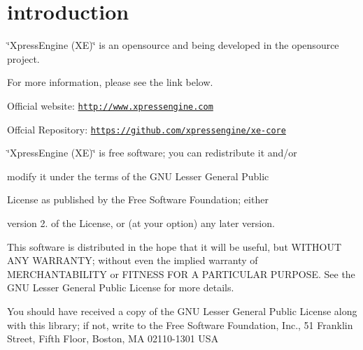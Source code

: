 \hypertarget{index_intro}{}\section{introduction}\label{index_intro}
\char`\"{}\-Xpress\-Engine (\-X\-E)\char`\"{} is an opensource and being developed in the opensource project.\par
For more information, please see the link below.
\begin{DoxyItemize}
\item Official website\-: \href{http://www.xpressengine.com}{\tt http\-://www.\-xpressengine.\-com}
\item Offcial Repository\-: \href{https://github.com/xpressengine/xe-core}{\tt https\-://github.\-com/xpressengine/xe-\/core} \par
\char`\"{}\-Xpress\-Engine (\-X\-E)\char`\"{} is free software; you can redistribute it and/or \par
modify it under the terms of the G\-N\-U Lesser General Public \par
License as published by the Free Software Foundation; either \par
version 2. of the License, or (at your option) any later version. \par
\par
This software is distributed in the hope that it will be useful, but W\-I\-T\-H\-O\-U\-T A\-N\-Y W\-A\-R\-R\-A\-N\-T\-Y; without even the implied warranty of M\-E\-R\-C\-H\-A\-N\-T\-A\-B\-I\-L\-I\-T\-Y or F\-I\-T\-N\-E\-S\-S F\-O\-R A P\-A\-R\-T\-I\-C\-U\-L\-A\-R P\-U\-R\-P\-O\-S\-E. See the G\-N\-U Lesser General Public License for more details. \par
You should have received a copy of the G\-N\-U Lesser General Public License along with this library; if not, write to the Free Software Foundation, Inc., 51 Franklin Street, Fifth Floor, Boston, M\-A 02110-\/1301 U\-S\-A 
\end{DoxyItemize}
